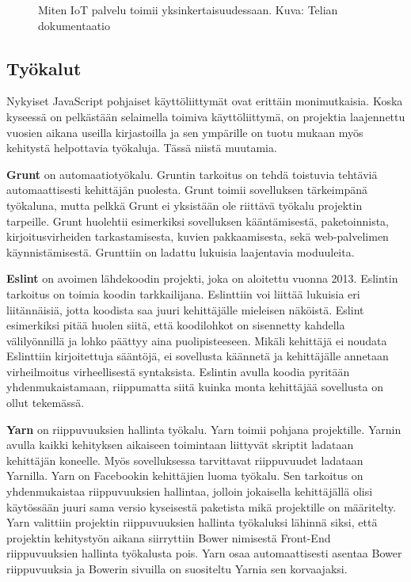 \documentclass{tktltiki}
\begin{document}
\begin{figure}[h]
\begin{center}
\caption{Miten IoT palvelu toimii yksinkertaisuudessaan. Kuva: Telian dokumentaatio}
\label{IoT arkkitehtuuri}
\end{center}
\end{figure}

\subsection{Työkalut}

Nykyiset JavaScript pohjaiset käyttöliittymät ovat erittäin monimutkaisia. Koska kyseessä on pelkästään selaimella toimiva käyttöliittymä, on projektia laajennettu vuosien aikana useilla kirjastoilla ja sen ympärille on tuotu mukaan myös kehitystä helpottavia työkaluja. Tässä niistä muutamia. 

\textbf{Grunt} on automaatiotyökalu. Gruntin tarkoitus on tehdä toistuvia tehtäviä automaattisesti kehittäjän puolesta. Grunt toimii sovelluksen tärkeimpänä työkaluna, mutta pelkkä Grunt ei yksistään ole riittävä työkalu projektin tarpeille. Grunt huolehtii esimerkiksi sovelluksen kääntämisestä, paketoinnista, kirjoitusvirheiden tarkastamisesta, kuvien pakkaamisesta, sekä web-palvelimen käynnistämisestä. Grunttiin on ladattu lukuisia laajentavia moduuleita.

\textbf{Eslint} on avoimen lähdekoodin projekti, joka on aloitettu vuonna 2013. Eslintin tarkoitus on toimia koodin tarkkailijana. Eslinttiin voi liittää lukuisia eri liitännäisiä, jotta koodista saa juuri kehittäjälle mieleisen näköistä. Eslint esimerkiksi pitää huolen siitä, että koodilohkot on sisennetty kahdella välilyönnillä ja lohko päättyy aina puolipisteeseen. Mikäli kehittäjä ei noudata Eslinttiin kirjoitettuja sääntöjä, ei sovellusta käännetä ja kehittäjälle annetaan virheilmoitus virheellisestä syntaksista. Eslintin avulla koodia pyritään yhdenmukaistamaan, riippumatta siitä kuinka monta kehittäjää sovellusta on ollut tekemässä. 

\textbf{Yarn} on riippuvuuksien hallinta työkalu. Yarn toimii pohjana projektille. Yarnin avulla kaikki kehityksen aikaiseen toimintaan liittyvät skriptit ladataan kehittäjän koneelle. Myös sovelluksessa tarvittavat riippuvuudet ladataan Yarnilla. Yarn on Facebookin kehittäjien luoma työkalu. Sen tarkoitus on yhdenmukaistaa riippuvuuksien hallintaa, jolloin jokaisella kehittäjällä olisi käytössään juuri sama versio kyseisestä paketista mikä projektille on määritelty. Yarn valittiin projektin riippuvuuksien hallinta työkaluksi lähinnä siksi, että projektin kehitystyön aikana siirryttiin Bower nimisestä Front-End riippuvuuksien hallinta työkalusta pois. Yarn osaa automaattisesti asentaa Bower riippuvuuksia ja Bowerin sivuilla on suositeltu Yarnia sen korvaajaksi. 
\end{document}
